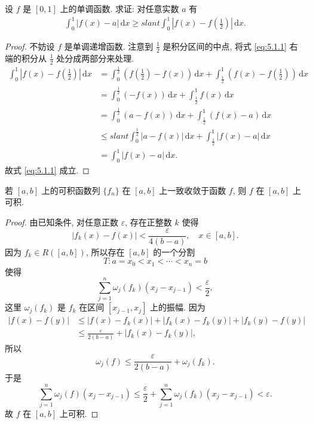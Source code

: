 \documentclass[../../main.tex]{subfiles}
\begin{document}
\begin{example}
设 $f$ 是 $[0,1]$ 上的单调函数. 求证: 对任意实数 $a$ 有
\begin{align}\label{eq:5.1.1}
\int_{0}^{1}|f(x)-a|\,\mathrm{d}x\geqslant slant\int_{0}^{1}\left|f(x)-f\left(\frac{1}{2}\right)\right|\,\mathrm{d}x.
\end{align}
\end{example}
\begin{proof}
不妨设 $f$ 是单调递增函数. 注意到 $\frac{1}{2}$ 是积分区间的中点, 将式 \eqref{eq:5.1.1} 右端的积分从 $\frac{1}{2}$ 处分成两部分来处理.
\begin{align*}
\int_{0}^{1}\left|f(x)-f\left(\frac{1}{2}\right)\right|\,\mathrm{d}x&=\int_{0}^{\frac{1}{2}}\left(f\left(\frac{1}{2}\right)-f(x)\right)\,\mathrm{d}x+\int_{\frac{1}{2}}^{1}\left(f(x)-f\left(\frac{1}{2}\right)\right)\,\mathrm{d}x\\
&=\int_{0}^{\frac{1}{2}}(-f(x))\,\mathrm{d}x+\int_{\frac{1}{2}}^{1}f(x)\,\mathrm{d}x\\
&=\int_{0}^{\frac{1}{2}}(a-f(x))\,\mathrm{d}x+\int_{\frac{1}{2}}^{1}(f(x)-a)\,\mathrm{d}x\\
&\leqslant slant\int_{0}^{\frac{1}{2}}|a-f(x)|\,\mathrm{d}x+\int_{\frac{1}{2}}^{1}|f(x)-a|\,\mathrm{d}x\\
&=\int_{0}^{1}|f(x)-a|\,\mathrm{d}x.
\end{align*}
故式 \eqref{eq:5.1.1} 成立.
\end{proof}

\begin{example}
若 $[a,b]$ 上的可积函数列 $\{f_n\}$ 在 $[a,b]$ 上一致收敛于函数 $f$, 则 $f$ 在 $[a,b]$ 上可积.
\end{example}
\begin{proof}
由已知条件, 对任意正数 $\varepsilon$, 存在正整数 $k$ 使得
$$|f_k(x)-f(x)|<\frac{\varepsilon}{4(b-a)}, \quad x \in[a,b].$$
因为 $f_k \in R([a,b])$, 所以存在 $[a,b]$ 的一个分割
$$T: a=x_0<x_1<\cdots<x_n=b$$
使得
$$\sum_{j=1}^n \omega_j(f_k)(x_j-x_{j-1})<\frac{\varepsilon}{2},$$
这里 $\omega_j(f_k)$ 是 $f_k$ 在区间 $[x_{j-1},x_j]$ 上的振幅. 因为
$$
\begin{aligned}
|f(x)-f(y)| & \leqslant |f(x)-f_k(x)|+\left|f_k(x)-f_k(y)\right|+\left|f_k(y)-f(y)\right| \\
& \leqslant  \frac{\varepsilon}{2(b-a)}+\left|f_k(x)-f_k(y)\right|,
\end{aligned}
$$
所以
$$\omega_j(f) \leqslant  \frac{\varepsilon}{2(b-a)}+\omega_j(f_k).$$
于是
$$\sum_{j=1}^n \omega_j(f)\left(x_j-x_{j-1}\right) \leqslant  \frac{\varepsilon}{2}+\sum_{j=1}^n \omega_j\left(f_k\right)\left(x_j-x_{j-1}\right)<\varepsilon.$$
故 $f$ 在 $[a,b]$ 上可积.
\end{proof}
\end{document}
